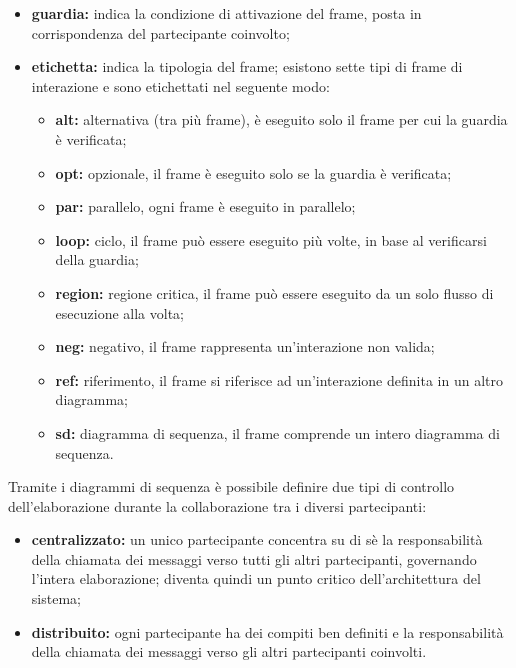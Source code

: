 \begin{itemize}[leftmargin=1.5cm]
							\begin{itemize}
								\item \textbf{guardia:} indica la condizione di attivazione del frame, posta in corrispondenza del partecipante coinvolto;
								\item \textbf{etichetta:} indica la tipologia del frame; esistono sette tipi di frame di interazione e sono etichettati nel seguente modo:
								\begin{itemize}
									\item \textbf{alt:} alternativa (tra più frame), è eseguito solo il frame per cui la guardia è verificata;
									\item \textbf{opt:} opzionale, il frame è eseguito solo se la guardia è verificata;
									\item \textbf{par:} parallelo, ogni frame è eseguito in parallelo;
									\item \textbf{loop:} ciclo, il frame può essere eseguito più volte, in base al verificarsi della guardia;
									\item \textbf{region:} regione critica, il frame può essere eseguito da un solo flusso di esecuzione alla volta;
									\item \textbf{neg:} negativo, il frame rappresenta un'interazione non valida;
									\item \textbf{ref:} riferimento, il frame si riferisce ad un'interazione definita in un altro diagramma;
									\item \textbf{sd:} diagramma di sequenza, il frame comprende un intero diagramma di sequenza.
								\end{itemize}
							\end{itemize}
						\end{itemize}

						\hangindent=0.6cm Tramite i diagrammi di sequenza è possibile definire due tipi di controllo dell'elaborazione durante la collaborazione tra i diversi partecipanti:
						\begin{itemize}[leftmargin=1.5cm]
							\item \textbf{centralizzato:} un unico partecipante concentra su di sè la responsabilità della chiamata dei messaggi verso tutti gli altri partecipanti, governando l'intera elaborazione; diventa quindi un punto critico dell'architettura del sistema;
							\item \textbf{distribuito:} ogni partecipante ha dei compiti ben definiti e la responsabilità della chiamata dei messaggi verso gli altri partecipanti coinvolti.
						\end{itemize}
						

